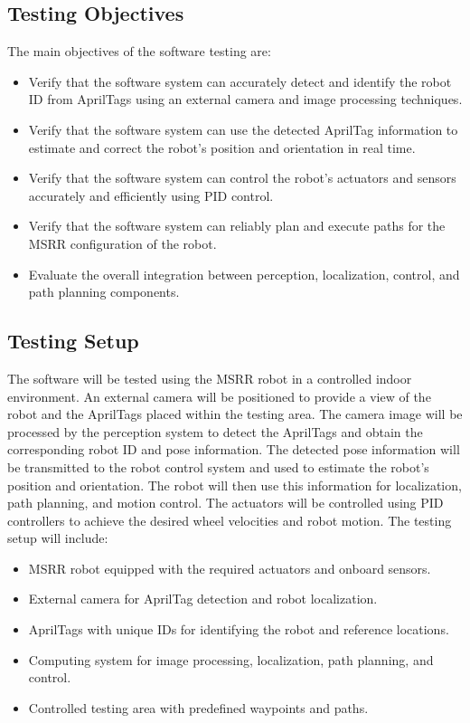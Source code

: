 \documentclass[12pt,a4paper]{article}
\begin{document}
	\subsection{Testing Objectives}
	The main objectives of the software testing are:
		\begin{itemize}
		\item Verify that the software system can accurately detect and identify the robot ID from AprilTags using an external camera and image processing techniques.
		\item Verify that the software system can use the detected AprilTag information to estimate and correct the robot's position and orientation in real time.
		\item Verify that the software system can control the robot's actuators and sensors accurately and efficiently using PID control.
		\item Verify that the software system can reliably plan and execute paths for the MSRR configuration of the robot.
		\item Evaluate the overall integration between perception, localization, control, and path planning components.
		\end{itemize}

	\subsection{Testing Setup}
	The software will be tested using the MSRR robot in a controlled indoor environment. An external camera will be positioned to provide a view of the robot and the AprilTags placed within the testing area. The camera image will be processed by the perception system to detect the AprilTags and obtain the corresponding robot ID and pose information.
	The detected pose information will be transmitted to the robot control system and used to estimate the robot's position and orientation. The robot will then use this information for localization, path planning, and motion control. The actuators will be controlled using PID controllers to achieve the desired wheel velocities and robot motion.
	The testing setup will include:
		\begin{itemize}
		\item MSRR robot equipped with the required actuators and onboard sensors.
		\item External camera for AprilTag detection and robot localization.
		\item AprilTags with unique IDs for identifying the robot and reference locations.
		\item Computing system for image processing, localization, path planning, and control.
		\item Controlled testing area with predefined waypoints and paths.
		\end{itemize}
\end{document}
